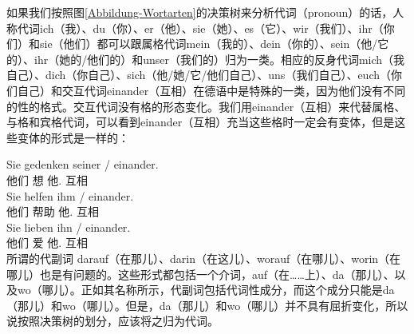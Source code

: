 如果我们按照图\ref{Abbildung-Wortarten}的决策树来分析代词（pronoun）的话，人称代词ich（我）、du（你）、er（他）、sie（她）、es（它）、wir（我们）、ihr（你们）和sie（他们）都可以跟属格代词mein（我的）、dein（你的）、sein（他/它的）、ihr（她的/他们的）和unser（我们的）归为一类。相应的反身代词mich（我自己）、dich（你自己）、sich（他/她/它/他们自己）、uns（我们自己）、euch（你们自己）和交互代词einander（互相）在德语中是特殊的一类，因为他们没有不同的性的格式。交互代词没有格的形态变化。我们用einander（互相）来代替属格、与格和宾格代词，可以看到einander（互相）充当这些格时一定会有变体，但是这些变体的形式是一样的：

\eal
\ex 
\gll Sie gedenken seiner / einander.\\
	 他们 想 他.\gen{} {} 互相\\
\ex 
\gll Sie helfen ihm / einander.\\
	 他们 帮助 他.\dat{} {} 互相\\
\ex 
\gll Sie lieben ihn / einander.\\
	 他们 爱 他.\acc{} {} 互相\\
\zl
%
所谓的代副词 darauf（在那儿）、darin（在这儿）、worauf（在哪儿）、worin（在哪儿）也是有问题的。这些形式都包括一个介词，\egc auf（在……上）、da（那儿）、以及wo（哪儿）。正如其名称所示，代副词包括代词性成分，而这个成分只能是da（那儿）和wo（哪儿）。但是，da（那儿）和wo（哪儿）并不具有屈折变化，所以说按照决策树的划分，应该将之归为代词。

